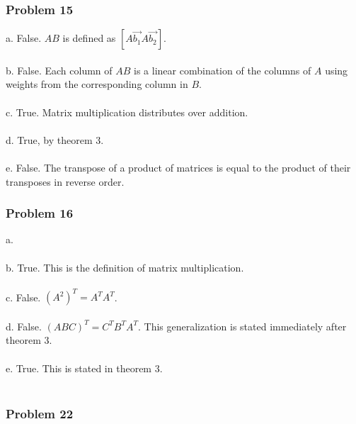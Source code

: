 \documentclass{article}%
\begin{document}
\subsubsection{Problem 15}
a. False. $AB$ is defined as $[A\vec{b_1} A\vec{b_2}]$.\\
\\
b. False. Each column of $AB$ is a linear combination of the columns of $A$ using weights from the corresponding
column in $B$.\\
\\
c. True. Matrix multiplication distributes over addition.\\
\\
d. True, by theorem 3.\\
\\
e. False. The transpose of a product of matrices is equal to the product of their transposes in reverse order.
\\

\subsubsection{Problem 16}
a.\\
\\
b. True. This is the definition of matrix multiplication.\\
\\
c. False. $(A^2)^T = A^TA^T$.\\
\\
d. False. $(ABC)^T = C^TB^TA^T$. This generalization is stated immediately after theorem 3.\\
\\
e. True. This is stated in theorem 3.\\
\\

\subsubsection{Problem 22}
\end{document}
